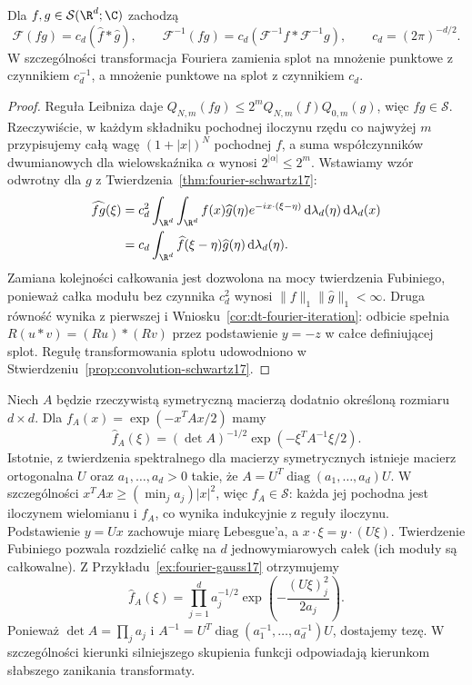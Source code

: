 \begin{stwierdzenie}
\label{prop:dt-fourier-product}
Dla $f,g\in\mathcal S(\R^d;\C)$ zachodzą
\[
 \mathcal F(fg)=c_d(\widehat f*\widehat g),\qquad
 \mathcal F^{-1}(fg)=c_d(\mathcal F^{-1}f*\mathcal F^{-1}g),
 \qquad c_d=(2\pi)^{-d/2}.
\]
W szczególności transformacja Fouriera zamienia
splot na mnożenie punktowe z czynnikiem $c_d^{-1}$,
a mnożenie punktowe na splot z czynnikiem $c_d$.
\end{stwierdzenie}
\begin{proof}
Reguła Leibniza daje
$Q_{N,m}(fg)\le 2^m Q_{N,m}(f)Q_{0,m}(g)$,
więc $fg\in\mathcal S$. Rzeczywiście, w każdym składniku
pochodnej iloczynu rzędu co najwyżej $m$ przypisujemy
całą wagę $(1+|x|)^N$ pochodnej $f$, a suma
współczynników dwumianowych dla wielowskaźnika
$\alpha$ wynosi $2^{|\alpha|}\le2^m$.
Wstawiamy wzór odwrotny dla $g$ z
Twierdzenia~\ref{thm:fourier-schwartz17}:
\[
\begin{aligned}
 \widehat{fg}(\xi)
 &=c_d^2\int_{\R^d}\int_{\R^d}
 f(x)\widehat g(\eta)e^{-ix\cdot(\xi-\eta)}
 \,\mathrm d\lambda_d(\eta)\,\mathrm d\lambda_d(x)\\
 &=c_d\int_{\R^d}\widehat f(\xi-\eta)\widehat g(\eta)
 \,\mathrm d\lambda_d(\eta).
\end{aligned}
\]
Zamiana kolejności całkowania jest dozwolona na mocy
twierdzenia Fubiniego, ponieważ całka modułu bez czynnika
$c_d^2$ wynosi $\|f\|_1\|\widehat g\|_1<\infty$.
Druga równość wynika z pierwszej i Wniosku~\ref{cor:dt-fourier-iteration}:
odbicie spełnia $R(u*v)=(Ru)*(Rv)$ przez podstawienie
$y=-z$ w całce definiującej splot.
Regułę transformowania splotu udowodniono w
Stwierdzeniu~\ref{prop:convolution-schwartz17}.
\end{proof}

\begin{przyklad}
\label{ex:dt-fourier-gaussian-matrix}
Niech $A$ będzie rzeczywistą symetryczną macierzą
dodatnio określoną rozmiaru $d\times d$.
Dla $f_A(x)=\exp(-x^TAx/2)$ mamy
\[
 \widehat f_A(\xi)=(\det A)^{-1/2}
 \exp(-\xi^TA^{-1}\xi/2).
\]
Istotnie, z twierdzenia spektralnego dla macierzy
symetrycznych istnieje macierz ortogonalna $U$
oraz $a_1,\ldots,a_d>0$ takie, że
$A=U^T\operatorname{diag}(a_1,\ldots,a_d)U$.
W szczególności $x^TAx\ge(\min_j a_j)|x|^2$,
więc $f_A\in\mathcal S$: każda jej pochodna jest
iloczynem wielomianu i $f_A$, co wynika indukcyjnie
z reguły iloczynu.
Podstawienie $y=Ux$ zachowuje miarę Lebesgue'a,
a $x\cdot\xi=y\cdot(U\xi)$.
Twierdzenie Fubiniego pozwala rozdzielić całkę na
$d$ jednowymiarowych całek (ich moduły są całkowalne).
Z Przykładu~\ref{ex:fourier-gauss17} otrzymujemy
\[
 \widehat f_A(\xi)
 =\prod_{j=1}^d a_j^{-1/2}
 \exp\left(-\frac{(U\xi)_j^2}{2a_j}\right).
\]
Ponieważ $\det A=\prod_j a_j$ i
$A^{-1}=U^T\operatorname{diag}(a_1^{-1},\ldots,a_d^{-1})U$,
dostajemy tezę. W szczególności kierunki silniejszego
skupienia funkcji odpowiadają kierunkom słabszego
zanikania transformaty.
\end{przyklad}

